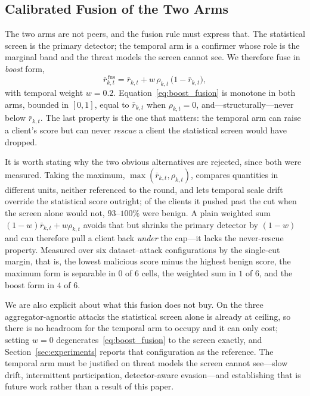\documentclass[journal]{IEEEtran}
\begin{document}
\subsection{Calibrated Fusion of the Two Arms}
\label{sec:fusion}

The two arms are not peers, and the fusion rule must express that. The statistical screen is the primary detector; the temporal arm is a confirmer whose role is the marginal band and the threat models the screen cannot see. We therefore fuse in \emph{boost} form,
\begin{equation}
\bar{r}^{\,\mathrm{fus}}_{k,t} = \bar r_{k,t} + w\,\rho_{k,t}\,\bigl( 1 - \bar r_{k,t} \bigr),
\label{eq:boost_fusion}
\end{equation}
with temporal weight $w = 0.2$. Equation~\eqref{eq:boost_fusion} is monotone in both arms, bounded in $[0,1]$, equal to $\bar r_{k,t}$ when $\rho_{k,t}=0$, and---structurally---never below $\bar r_{k,t}$. The last property is the one that matters: the temporal arm can raise a client's score but can never \emph{rescue} a client the statistical screen would have dropped.

It is worth stating why the two obvious alternatives are rejected, since both were measured. Taking the maximum, $\max(\bar r_{k,t}, \rho_{k,t})$, compares quantities in different units, neither referenced to the round, and lets temporal scale drift override the statistical score outright; of the clients it pushed past the cut when the screen alone would not, $93$--$100\%$ were benign. A plain weighted sum $(1-w)\bar r_{k,t} + w\rho_{k,t}$ avoids that but shrinks the primary detector by $(1-w)$ and can therefore pull a client back \emph{under} the cap---it lacks the never-rescue property. Measured over six dataset--attack configurations by the single-cut margin, that is, the lowest malicious score minus the highest benign score, the maximum form is separable in $0$ of $6$ cells, the weighted sum in $1$ of $6$, and the boost form in $4$ of $6$.

We are also explicit about what this fusion does not buy. On the three aggregator-agnostic attacks the statistical screen alone is already at ceiling, so there is no headroom for the temporal arm to occupy and it can only cost; setting $w=0$ degenerates~\eqref{eq:boost_fusion} to the screen exactly, and Section~\ref{sec:experiments} reports that configuration as the reference. The temporal arm must be justified on threat models the screen cannot see---slow drift, intermittent participation, detector-aware evasion---and establishing that is future work rather than a result of this paper.
\end{document}
